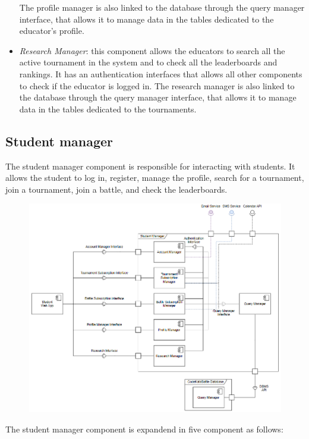 \documentclass[12pt, a4paper]{report}
\begin{document}
\begin{itemize}
            The profile manager is also linked to the database through the query manager interface, that allows it to manage data in the tables dedicated to the educator's profile.
        \item \textit{Research Manager}: this component allows the educators to search all the active tournament in the system and to check all the leaderboards and rankings. 
            It has an authentication interfaces that allows all other components to check if the educator is logged in.
            The research manager is also linked to the database through the query manager interface, that allows it to manage data in the tables dedicated to the tournaments.
    \end{itemize}

    \subsection{Student manager}
    The student manager component is responsible for interacting with students.
    It allows the student to log in, register, manage the profile, search for a tournament, join a tournament, join a battle, and check the leaderboards.  
    \begin{figure}[H]
        \centering
        \includegraphics[width=0.8\linewidth]{images/component_view_student.png}
    \end{figure}
    The student manager component is expandend in five component as follows: 
\end{document}
